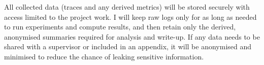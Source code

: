 All collected data (traces and any derived metrics) will be stored securely with access limited to the project work. I will keep raw logs only for as long as needed to run experiments and compute results, and then retain only the derived, anonymised summaries required for analysis and write-up. If any data needs to be shared with a supervisor or included in an appendix, it will be anonymised and minimised to reduce the chance of leaking sensitive information.
